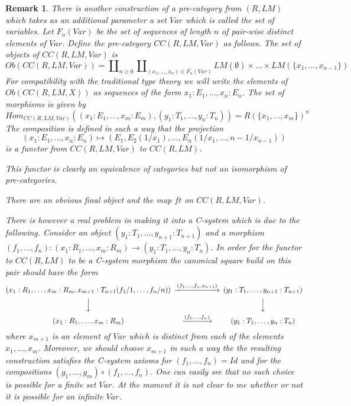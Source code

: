 \documentclass[11pt]{article}
\newtheorem{remark}[proposition]{Remark}
\newcommand{\sr}{\rightarrow}
\begin{document}
\begin{remark}\rm
There is another construction of a pre-category from $(R,LM)$ which takes as an additional parameter a set $Var$ which is called the set of variables. Let $F_n(Var)$ be the set of sequences of length $n$ of pair-wise distinct elements of $Var$. Define the pre-category $CC(R,LM,Var)$ as follows. The set of objects of $CC(R,LM,Var)$ is 
%
$$Ob(CC(R,LM,Var))= \amalg_{n\ge 0} \amalg_{(x_1,\dots,x_n)\in F_n(Var)} LM(\emptyset)\times\dots\times LM(\{x_1,\dots,x_{n-1}\})$$
%
For compatibility with the traditional type theory we will write the elements of $Ob(CC(R,LM,X))$ as sequences of the form $x_1:E_1,\dots,x_n:E_n$. The set of morphisms is given by
%
$$Hom_{CC(R,LM,Var)}((x_1:E_1,\dots,x_m:E_m),(y_1:T_1,\dots,y_n:T_n))=R(\{x_1,\dots,x_m\})^n$$
%
The composition is defined in such a way that the projection 
%
$$(x_1:E_1,\dots,x_n:E_n)\mapsto (E_1,E_2(1/x_1),\dots,E_n(1/x_1,\dots,n-1/x_{n-1}))$$
%
is a functor from $CC(R,LM,Var)$ to $CC(R,LM)$. 

This functor is clearly an equivalence of categories but not an isomorphism of pre-categories. 

There are an obvious final object and the map $ft$ on $CC(R,LM,Var)$. 

There is however a real problem in making it into a C-system  which is due to the following. Consider an object $(y_1:T_1,\dots,y_{n+1}:T_{n+1})$ and a morphism $(f_1,\dots,f_n):(x_1:R_1,\dots,x_m:R_m)\sr (y_1:T_1,\dots,y_{n}:T_{n})$. In order for the functor to $CC(R,LM)$ to be a C-system morphism the canonical square build on this pair should have the form
%
$$
\begin{CD}
(x_1:R_1,\dots,x_m:R_m,x_{m+1}:T_{n+1}(f_1/1,\dots, f_{n}/n)) @>(f_1,\dots,f_{n},x_{n+1})>> (y_1:T_1,\dots,y_{n+1}:T_{n+1})\\
@VVV @VVV\\
(x_1:R_1,\dots,x_m:R_m) @>(f_1,\dots,f_{n})>> (y_1:T_1,\dots,y_n:T_{n})
\end{CD}
$$
%
where $x_{m+1}$ is an element of $Var$ which is distinct from each of the elements $x_1,\dots,x_m$. Moreover, we should choose  $x_{m+1}$ in such a way the the resulting construction satisfies the C-system axioms for $(f_1,\dots,f_{n})=Id$ and for the compositions $(g_1,\dots,g_m)\circ (f_1,\dots,f_n)$. One can easily see that no such choice is possible for a finite set $Var$. At the moment it is not clear to me whether or not it is possible for an infinite $Var$.
\end{remark}
%
\end{document}
